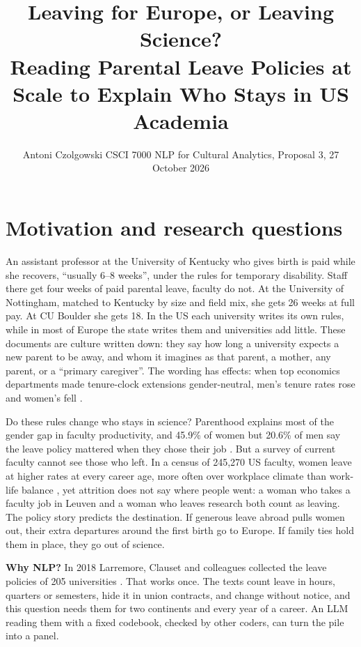 \documentclass[10pt,twocolumn]{article}
\title{\vspace{-0.62in}\large\textbf{Leaving for Europe, or Leaving Science?}\\[2pt]\normalsize Reading Parental Leave Policies at Scale to Explain Who Stays in US Academia}
\author{\normalsize Antoni Czolgowski \quad CSCI 7000 NLP for Cultural Analytics, Proposal 3, 27 October 2026}
\date{\vspace{-0.32in}}
\begin{document}
\maketitle

\section{Motivation and research questions}
An assistant professor at the University of Kentucky who gives birth is paid while she recovers, ``usually 6--8 weeks'', under the rules for temporary disability. Staff there get four weeks of paid parental leave, faculty do not. At the University of Nottingham, matched to Kentucky by size and field mix, she gets 26 weeks at full pay. At CU Boulder she gets 18. In the US each university writes its own rules, while in most of Europe the state writes them and universities add little. These documents are culture written down: they say how long a university expects a new parent to be away, and whom it imagines as that parent, a mother, any parent, or a ``primary caregiver''. The wording has effects: when top economics departments made tenure-clock extensions gender-neutral, men's tenure rates rose and women's fell \citep{antecol2018}.

Do these rules change who stays in science? Parenthood explains most of the gender gap in faculty productivity, and 45.9\% of women but 20.6\% of men say the leave policy mattered when they chose their job \citep{morgan2021}. But a survey of current faculty cannot see those who left. In a census of 245,270 US faculty, women leave at higher rates at every career age, more often over workplace climate than work-life balance \citep{spoon2023}, yet attrition does not say where people went: a woman who takes a faculty job in Leuven and a woman who leaves research both count as leaving. The policy story predicts the destination. If generous leave abroad pulls women out, their extra departures around the first birth go to Europe. If family ties hold them in place, they go out of science.

\textbf{Why NLP?} In 2018 Larremore, Clauset and colleagues collected the leave policies of 205 universities \citep{morgan2018}. That works once. The texts count leave in hours, quarters or semesters, hide it in union contracts, and change without notice, and this question needs them for two continents and every year of a career. An LLM reading them with a fixed codebook, checked by other coders, can turn the pile into a panel.
\end{document}
